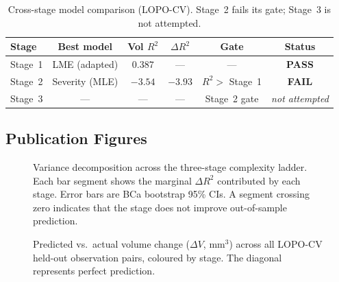 \begin{table}[H]
  \centering
  \caption{Cross-stage model comparison (LOPO-CV). Stage~2 fails its gate;
    Stage~3 is not attempted.}
  \label{tab:cross_stage_comparison}
  \begin{tabular}{lccccc}
    \toprule
    \textbf{Stage} & \textbf{Best model} & \textbf{Vol $R^2$} &
      \textbf{$\Delta R^2$} & \textbf{Gate} &
      \textbf{Status} \\
    \midrule
    Stage~1 & LME (adapted) & $\mathbf{0.387}$ & --- & --- & \textbf{PASS} \\
    Stage~2 & Severity (MLE) & $-3.54$ & $-3.93$ & $R^2 >$ Stage~1 & \textbf{FAIL} \\
    Stage~3 & --- & --- & --- & Stage~2 gate & \textit{not attempted} \\
    \bottomrule
  \end{tabular}
\end{table}

\subsection{Publication Figures}
\label{sec:eval:figures}

\begin{figure}[H]
  \centering
  \caption{Variance decomposition across the three-stage complexity ladder.
    Each bar segment shows the marginal $\Delta R^2$ contributed by each
    stage. Error bars are BCa bootstrap 95\% CIs. A segment crossing zero
    indicates that the stage does not improve out-of-sample prediction.}
  \label{fig:variance_decomposition}
\end{figure}

\begin{figure}[H]
  \centering
  \caption{Predicted vs.\ actual volume change ($\Delta V$, mm$^3$) across
    all LOPO-CV held-out observation pairs, coloured by stage. The
    diagonal represents perfect prediction.}
  \label{fig:vol_scatter}
\end{figure}

